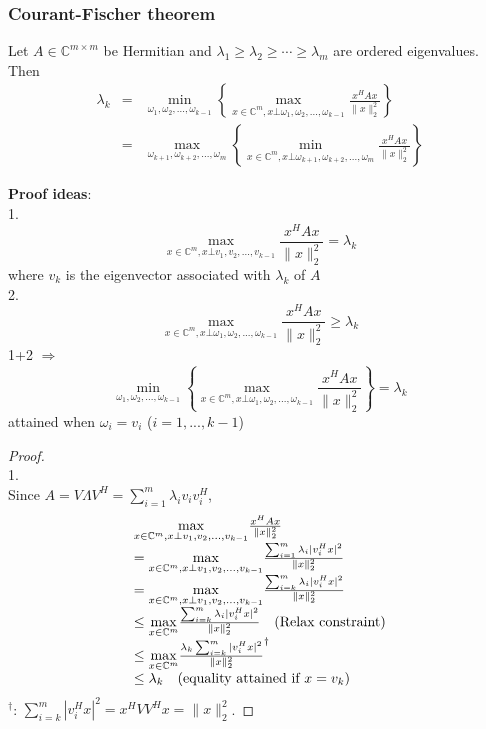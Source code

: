 \begin{multicols}{2}
\subsubsection{Courant-Fischer theorem}
\begin{theorem}
    Let $A\in\mathbb{C}^{m\times m}$ be Hermitian and $\lambda_1\geq \lambda_2 \geq \cdots \geq \lambda_m$ are ordered eigenvalues. Then
    \[
        \begin{array}{llc}
            \lambda_k &=&  \underset{\omega_1,\omega_2,...,\omega_{k-1}}{\min} \left\{\underset{x\in\mathbb{C}^m,x\bot \omega_1,\omega_2,...,\omega_{k-1}}{\max} \frac{x^HAx}{\|x\|_2^2}\right\}\\
            &=&    \underset{\omega_{k+1},\omega_{k+2},...,\omega_{m}}{\max} \left\{\underset{x\in\mathbb{C}^m,x\bot \omega_{k+1},\omega_{k+2},...,\omega_{m}}{\min} \frac{x^HAx}{\|x\|_2^2}\right\}        
        \end{array}
    \]
\end{theorem}
\textbf{Proof ideas}: \\
1.
\[
    \underset{x\in\mathbb{C}^m,x\bot v_1,v_2,...,v_{k-1}}{\max} \frac{x^HAx}{\|x\|_2^2} = \lambda_k
\]
where $v_k$ is the eigenvector associated with $\lambda_k$ of $A$ \\
2.
\[
    \underset{x\in\mathbb{C}^m,x\bot \omega_1,\omega_2,...,\omega_{k-1}}{\max} \frac{x^HAx}{\|x\|_2^2} \geq \lambda_k
\]
1+2 $ \Longrightarrow$
\[
    \underset{\omega_1,\omega_2,...,\omega_{k-1}}{\min} \left\{\underset{x\in\mathbb{C}^m,x\bot \omega_1,\omega_2,...,\omega_{k-1}}{\max} \frac{x^HAx}{\|x\|_2^2}\right\}
    =\lambda_k
\]
attained when $\omega_i = v_i$ ($i=1,...,k-1$)


\begin{proof} \\
    1. \\
    Since $A=V\Lambda V^H=\sum_{i=1}^m\lambda_iv_iv_i^H$,
    \[
        \begin{array}{l}
            \underset{x\in\mathbb{C}^m,x\bot v_1,v_2,...,v_{k-1}}{\max} \frac{x^HAx}{\|x\|_2^2} \\
            = \underset{x\in\mathbb{C}^m,x\bot v_1,v_2,...,v_{k-1}}{\max} \frac{\sum_{i=1}^m\lambda_i|v_i^Hx|^2}{\|x\|_2^2} \\
            = \underset{x\in\mathbb{C}^m,x\bot v_1,v_2,...,v_{k-1}}{\max} \frac{\sum_{i=k}^m\lambda_i|v_i^Hx|^2}{\|x\|_2^2} \\
            \leq \underset{x\in\mathbb{C}^m}{\max} \frac{\sum_{i=k}^m\lambda_i|v_i^Hx|^2}{\|x\|_2^2} \quad(\text{\rm Relax constraint}) \\
            \leq \underset{x\in\mathbb{C}^m}{\max} \frac{\lambda_k\sum_{i=k}^m|v_i^Hx|^2}{\|x\|_2^2} ^\dagger \\
            \leq \lambda_k \quad (\text{\rm equality attained if } x=v_k)
        \end{array}
    \]
    $^\dagger$: $\sum_{i=k}^m|v_i^Hx|^2=x^HVV^Hx=\|x\|_2^2$.


\end{proof}
\end{multicols}
